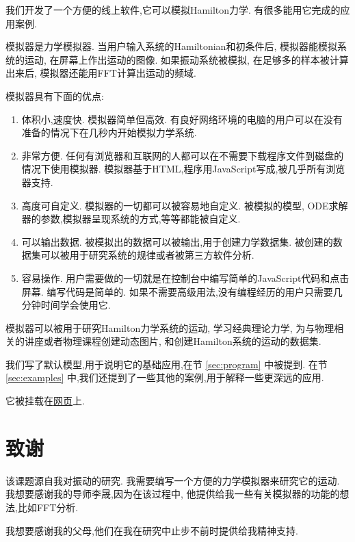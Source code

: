 \documentclass[12pt]{article}
\begin{document}
我们开发了一个方便的线上软件,它可以模拟Hamilton力学.
有很多能用它完成的应用案例.

模拟器是力学模拟器.
当用户输入系统的Hamiltonian和初条件后,
模拟器能模拟系统的运动,
在屏幕上作出运动的图像.
如果振动系统被模拟,
在足够多的样本被计算出来后,
模拟器还能用FFT计算出运动的频域.

模拟器具有下面的优点:
\begin{enumerate}
  \item 体积小,速度快.
  模拟器简单但高效.
  有良好网络环境的电脑的用户可以在没有准备的情况下在几秒内开始模拟力学系统.

  \item 非常方便.
  任何有浏览器和互联网的人都可以在不需要下载程序文件到磁盘的情况下使用模拟器.
  模拟器基于HTML,程序用JavaScript写成,被几乎所有浏览器支持.

  \item 高度可自定义.
  模拟器的一切都可以被容易地自定义.
  被模拟的模型, ODE求解器的参数,模拟器呈现系统的方式,等等都能被自定义.

  \item 可以输出数据.
  被模拟出的数据可以被输出,用于创建力学数据集.
  被创建的数据集可以被用于研究系统的规律或者被第三方软件分析.

  \item 容易操作.
  用户需要做的一切就是在控制台中编写简单的JavaScript代码和点击屏幕.
  编写代码是简单的.
  如果不需要高级用法,没有编程经历的用户只需要几分钟时间学会使用它.
\end{enumerate}

模拟器可以被用于研究Hamilton力学系统的运动,
学习经典理论力学,
为与物理相关的讲座或者物理课程创建动态图片,
和创建Hamilton系统的运动的数据集.

我们写了默认模型,用于说明它的基础应用,在节 \ref{sec:program} 中被提到.
在节 \ref{sec:examples} 中,我们还提到了一些其他的案例,用于解释一些更深远的应用.

它被挂载在\href{https://UlyssesZh.github.io/rpg/mechsimul2}{网页}上.

\newpage




\newpage

\section*{致谢}

该课题源自我对振动的研究.
我需要编写一个方便的力学模拟器来研究它的运动.
我想要感谢我的导师李晟,因为在该过程中,
他提供给我一些有关模拟器的功能的想法,比如FFT分析.

我想要感谢我的父母,他们在我在研究中止步不前时提供给我精神支持.
\end{document}
